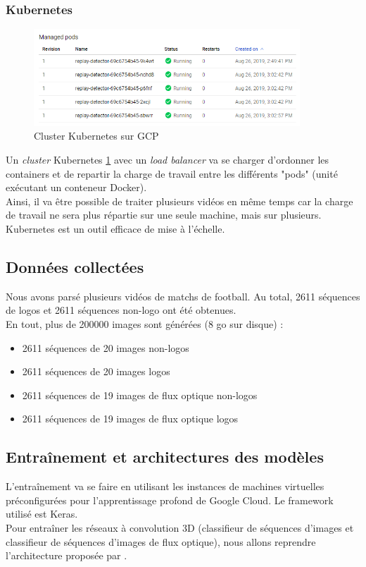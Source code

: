 \documentclass[11pt]{article}
\begin{document}
\subsubsection{Kubernetes}
\label{sec:org978028d}
\begin{figure}[htbp]
\centering
\includegraphics[width=10cm]{kubernetes_pods.PNG}
\caption{Cluster Kubernetes sur GCP \label{cluster-kubernetes}}
\end{figure}
Un \emph{cluster} Kubernetes \ref{cluster-kubernetes} avec un \emph{load balancer} va se charger d'ordonner les containers et de repartir la charge de travail entre les différents "pods" (unité exécutant un conteneur Docker).\\
Ainsi, il va être possible de traiter plusieurs vidéos en même temps car la charge de travail ne sera plus répartie sur une seule machine, mais sur plusieurs. Kubernetes est un outil efficace de mise à l'échelle.\\
\subsection{Données collectées}
\label{sec:org56eef65}
Nous avons parsé plusieurs vidéos de matchs de football. Au total, 2611 séquences de logos et 2611 séquences non-logo ont été obtenues.\\
En tout, plus de 200000 images sont générées (8 go sur disque) :\\
\begin{itemize}
\item 2611 séquences de 20 images non-logos\\
\item 2611 séquences de 20 images logos\\
\item 2611 séquences de 19 images de flux optique non-logos\\
\item 2611 séquences de 19 images de flux optique logos\\
\end{itemize}

\subsection{Entraînement et architectures des modèles}
\label{sec:orga489303}
L'entraînement va se faire en utilisant les instances de machines virtuelles préconfigurées pour l'apprentissage profond de Google Cloud. Le framework utilisé est Keras.\\
Pour entraîner les réseaux à convolution 3D (classifieur de séquences d'images et classifieur de séquences d'images de flux optique), nous allons reprendre l'architecture proposée par \cite{Tran_2015}.\\
\end{document}
